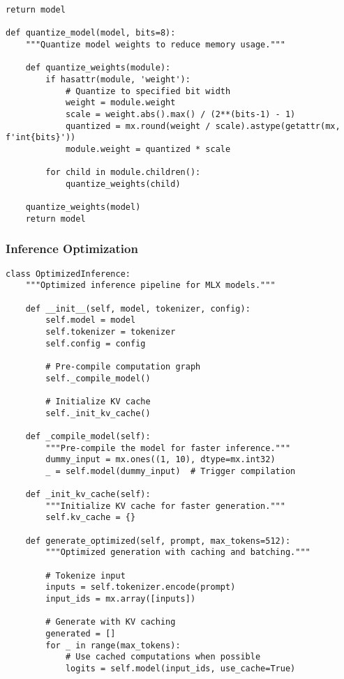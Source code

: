 \begin{table}[H]
\begin{lstlisting}[caption=MLX memory optimization implementation,label=lst:mlx-memory]
    return model

def quantize_model(model, bits=8):
    """Quantize model weights to reduce memory usage."""
    
    def quantize_weights(module):
        if hasattr(module, 'weight'):
            # Quantize to specified bit width
            weight = module.weight
            scale = weight.abs().max() / (2**(bits-1) - 1)
            quantized = mx.round(weight / scale).astype(getattr(mx, f'int{bits}'))
            module.weight = quantized * scale
        
        for child in module.children():
            quantize_weights(child)
    
    quantize_weights(model)
    return model
\end{lstlisting}

\subsubsection{Inference Optimization}

\begin{lstlisting}[caption=Optimized inference implementation,label=lst:inference-opt]
class OptimizedInference:
    """Optimized inference pipeline for MLX models."""
    
    def __init__(self, model, tokenizer, config):
        self.model = model
        self.tokenizer = tokenizer
        self.config = config
        
        # Pre-compile computation graph
        self._compile_model()
        
        # Initialize KV cache
        self._init_kv_cache()
    
    def _compile_model(self):
        """Pre-compile the model for faster inference."""
        dummy_input = mx.ones((1, 10), dtype=mx.int32)
        _ = self.model(dummy_input)  # Trigger compilation
    
    def _init_kv_cache(self):
        """Initialize KV cache for faster generation."""
        self.kv_cache = {}
        
    def generate_optimized(self, prompt, max_tokens=512):
        """Optimized generation with caching and batching."""
        
        # Tokenize input
        inputs = self.tokenizer.encode(prompt)
        input_ids = mx.array([inputs])
        
        # Generate with KV caching
        generated = []
        for _ in range(max_tokens):
            # Use cached computations when possible
            logits = self.model(input_ids, use_cache=True)
            

\end{lstlisting}
\end{table}
